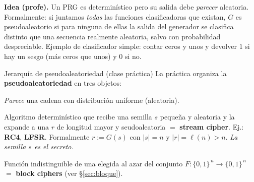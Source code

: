 \documentclass[11pt,a4paper]{article}
\newcommand{\bits}{\{0,1\}}
\begin{document}
\begin{slidebox}
\textbf{Idea (profe).} Un PRG es determinístico pero su salida debe \emph{parecer}
aleatoria. Formalmente: si juntamos \emph{todas} las funciones clasificadoras que
existan, $G$ es pseudoaleatorio si para ninguna de ellas la salida del generador se
clasifica distinto que una secuencia realmente aleatoria, salvo con probabilidad
despreciable. Ejemplo de clasificador simple: contar ceros y unos y devolver $1$ si hay
un sesgo (más ceros que unos) y $0$ si no.
\end{slidebox}

\begin{practbox}{Jerarquía de pseudoaleatoriedad (clase práctica)}
La práctica organiza la \textbf{pseudoaleatoriedad} en tres objetos:
\begin{center}
\end{center}
\begin{description}[leftmargin=0pt,style=nextline,itemsep=3pt]
  \item[Cadena seudoaleatoria.] \emph{Parece} una cadena con distribución uniforme
        (aleatoria).
  \item[Generador seudoaleatorio $G$.] Algoritmo determinístico que recibe una semilla
        $s$ pequeña y aleatoria y la expande a una $r$ de longitud mayor y
        seudoaleatoria $=$ \textbf{stream cipher}. Ej.: \textbf{RC4}, \textbf{LFSR}.
        Formalmente $r:=G(s)$ con $|s|=n$ y $|r|=\ell(n)>n$. \emph{La semilla $s$ es el
        secreto.}
  \item[Función seudoaleatoria $F_k$.] Función indistinguible de una elegida al azar del
        conjunto $F:\bits^{\,n}\to\bits^{\,n}$ $=$ \textbf{block ciphers} (ver
        \S\ref{sec:bloque}).
\end{description}
\end{practbox}
\end{document}
